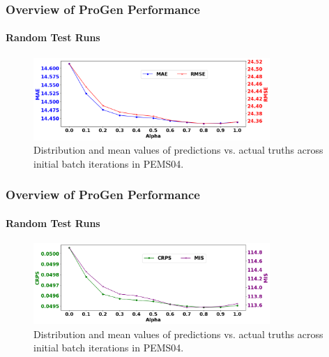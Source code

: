 \documentclass[light]{lutbeamer} %
\begin{document}
\begin{frame}
    \frametitle{Overview of ProGen Performance}
    \framesubtitle{Random Test Runs}

    \begin{figure}[ht]
        \centering
        \includegraphics[width=0.8\textwidth]{figures/pems07_mae_rmse_alpha.png        }
        \caption{Distribution and mean values of predictions vs. actual truths across initial batch iterations in PEMS04.}
    \end{figure}
\end{frame}

\begin{frame}
    \frametitle{Overview of ProGen Performance}
    \framesubtitle{Random Test Runs}

    \begin{figure}[ht]
        \centering
        \includegraphics[width=0.8\textwidth]{figures/pems07_crps_mis_alpha.png        }
        \caption{Distribution and mean values of predictions vs. actual truths across initial batch iterations in PEMS04.}
    \end{figure}
\end{frame}



\end{document}
